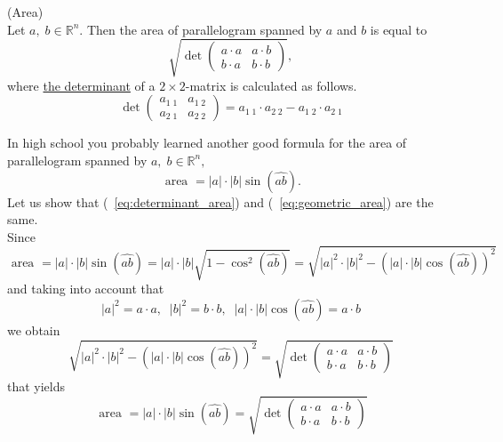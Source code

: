 \documentclass[color=black,11pt]{elegantpaper}
\begin{document}
\begin{definition}
(Area)\\
Let $a,\;b\in \mathbb{R}^n.$ Then the area of parallelogram spanned by $a$ and $b$ is equal to
\begin{equation}
\label{eq:determinant_area}
\sqrt{\det\left( \begin{array}{cc}
             a\cdot a& a\cdot b\\
             b\cdot a& b\cdot b
           \end{array} \right)},
\end{equation}
where \href{https://en.wikipedia.org/wiki/Determinant}{the determinant} of a $2 \times 2$-matrix is calculated as follows.
$$
\det \left( \begin{array}{cc}
a_{1\; 1}& a_{1\; 2}\\
a_{2\; 1} & a_{2\; 2} 
\end{array} \right) = a_{1\; 1} \cdot a_{2\; 2} - a_{1\; 2} \cdot a_{2\; 1}
$$
\end{definition}
In high school you probably learned another good formula for the area of parallelogram spanned by $a,\; b \in \mathbb{R}^n,$
\begin{equation}
\label{eq:geometric_area}
\mbox{ area }=|a|\cdot |b| \sin(\hat{ab}).
\end{equation}
Let us show that (~\ref{eq:determinant_area}) and (~\ref{eq:geometric_area}) are the same.\\
Since
$$
\mbox{ area }=|a|\cdot |b| \sin(\hat{ab}) = |a|\cdot |b|\sqrt{1- \cos^2(\hat{ab})} =\sqrt{|a|^2 \cdot |b|^2 - (|a|\cdot |b|  \cos(\hat{ab}))^2}
$$
and taking into account that
$$
|a|^2 = a\cdot a,\;\;|b|^2 = b\cdot b,\;\;|a|\cdot |b|  \cos(\hat{ab}) = a\cdot b
$$
we obtain
$$
\sqrt{|a|^2 \cdot |b|^2 - (|a|\cdot |b|  \cos(\hat{ab}))^2} = \sqrt{\det\left( \begin{array}{cc}
             a\cdot a& a\cdot b\\
             b\cdot a& b\cdot b  
           \end{array} \right)}
$$
that yields
$$
\mbox{ area }=|a|\cdot |b| \sin(\hat{ab})=\sqrt{\det\left( \begin{array}{cc}
             a\cdot a& a\cdot b\\
             b\cdot a& b\cdot b
           \end{array} \right)} 
$$
\end{document}
